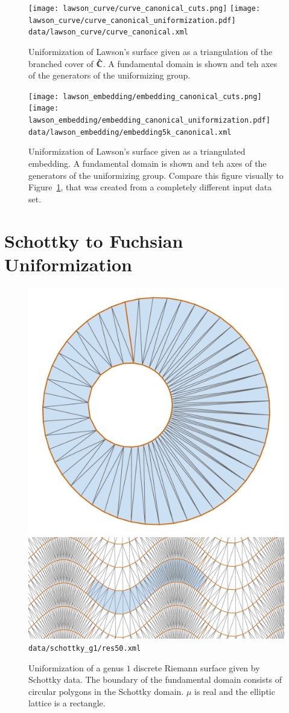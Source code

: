 \documentclass[Thesis.tex]{subfiles}
\begin{document}
\begin{figure}
	\centering
	\texttt{[image: lawson\_curve/curve\_canonical\_cuts.png]}
	\texttt{[image: lawson\_curve/curve\_canonical\_uniformization.pdf]}
	{\scriptsize\tt data/lawson\_curve/curve\_canonical.xml}
	\caption{Uniformization of Lawson's surface given as a triangulation
of the branched cover of $\hat{\mathbb C}$. A fundamental domain is shown and
teh axes of the generators of the uniformizing group.}
	\label{fig:lawson_curve_canonical}
\end{figure}


\begin{figure}
	\centering
	\texttt{[image: lawson\_embedding/embedding\_canonical\_cuts.png]}
	\texttt{[image: lawson\_embedding/embedding\_canonical\_uniformization.pdf]}
	{\scriptsize\tt data/lawson\_embedding/embedding5k\_canonical.xml}
	\caption{Uniformization of Lawson's surface given as a triangulated embedding. A fundamental domain is shown and
teh axes of the generators of the uniformizing group. Compare this figure visually to Figure~\ref{fig:lawson_curve_canonical}, that was created from a 
completely different input data set.}
	\label{fig:lawson_embedding_canonical}
\end{figure}

\section{Schottky to Fuchsian Uniformization}

\begin{figure}
	\centering
	\includegraphics[width=0.28\linewidth]{data/schottky_g1/res50_image}
	\quad
	\includegraphics[width=0.68\linewidth]{data/schottky_g1/res50_cover}
	{\scriptsize\tt data/schottky\_g1/res50.xml}
	\caption{Uniformization of a genus $1$ discrete Riemann surface given by Schottky data.
	The boundary of the fundamental domain consists of circular polygons in the Schottky domain. $\mu$ is real and the elliptic lattice is a rectangle.}
	\label{fig:fuchsian_to_schottky_genus1}
\end{figure}
\end{document}
